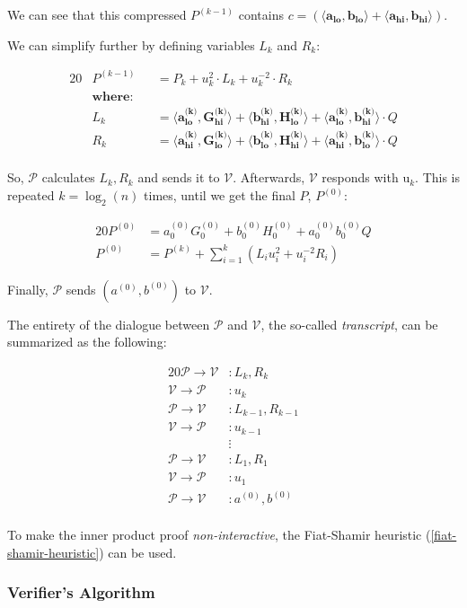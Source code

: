 \documentclass{article}
\newcommand{\eq}[1]{\begin{alignat*}{20}#1\end{alignat*}}
\renewcommand{\vec}[1]{\boldsymbol{#1}}
\newcommand{\ran}[1]{\mathrm{#1}}
\newcommand{\V}{\mathcal{V}}
\renewcommand{\P}{\mathcal{P}}
\newcommand{\dotp}[2]{\langle #1, #2 \rangle}
\newcommand{\opn}[1]{\operatorname{#1}}
\newcommand{\veclo}[1]{\vec{#1_{\opn{lo}}}}
\newcommand{\vechi}[1]{\vec{#1_{\opn{hi}}}}
\begin{document}
We can see that this compressed $P^{(k-1)}$ contains $c =
(\dotp{\veclo{a}}{\veclo{b}} + \dotp{\vechi{a}}{\vechi{b}})$.

We can simplify further by defining variables $L_k$ and $R_k$:

\eq{
	&P^{(k-1)} &&= P_k + u^2_k \cdot L_k + u^{-2}_k \cdot R_k \\
	&\textbf{where:} \\
	&L_k     &&= \dotp{\veclo{a^{\text{(k)}}}}{\vechi{G^{\text{(k)}}}} +
	             \dotp{\vechi{b^{\text{(k)}}}}{\veclo{H^{\text{(k)}}}} + 
	             \dotp{\veclo{a^{\text{(k)}}}}{\vechi{b^{\text{(k)}}}} \cdot Q \\
	&R_k     &&= \dotp{\vechi{a^{\text{(k)}}}}{\veclo{G^{\text{(k)}}}} +
	             \dotp{\veclo{b^{\text{(k)}}}}{\vechi{H^{\text{(k)}}}} +
	             \dotp{\vechi{a^{\text{(k)}}}}{\veclo{b^{\text{(k)}}}} \cdot Q \\
}

So, $\P$ calculates $L_k, R_k$ and sends it to $\V$. Afterwards,
$\V$ responds with $\ran{u}_k$. This is repeated $k = \log_2(n)$ times,
until we get the final $P$, $P^{(0)}$:

\eq{
	P^{(0)} &= a^{(0)}_0 G^{(0)}_0 + b^{(0)}_0 H^{(0)}_0 + a^{(0)}_0 b^{(0)}_0 Q \\
	P^{(0)} &= P^{(k)} + \sum^k_{i=1}(L_i u^2_i + u^{-2}_i R_i)
}

Finally, $\P$ sends $(a^{(0)}, b^{(0)})$ to $\V$.

The entirety of the dialogue between $\P$ and $\V$,
the so-called \textit{transcript}, can be summarized as the following:

\eq{
	\P \rightarrow \V &: L_k, R_k \\
	\V \rightarrow \P &: u_k \\[5pt]
	\P \rightarrow \V &: L_{k-1}, R_{k-1} \\
	\V \rightarrow \P &: u_{k-1} \\[-5pt]
	                  &\vdots \\
	\P \rightarrow \V &: L_{1}, R_{1} \\
	\V \rightarrow \P &: u_{1} \\[5pt]
	\P \rightarrow \V &: a^{(0)}, b^{(0)} \\
}

To make the inner product proof \textit{non-interactive}, the
Fiat-Shamir heuristic (\ref{fiat-shamir-heuristic}) can be used.

\subsubsection{Verifier's Algorithm}
\end{document}
